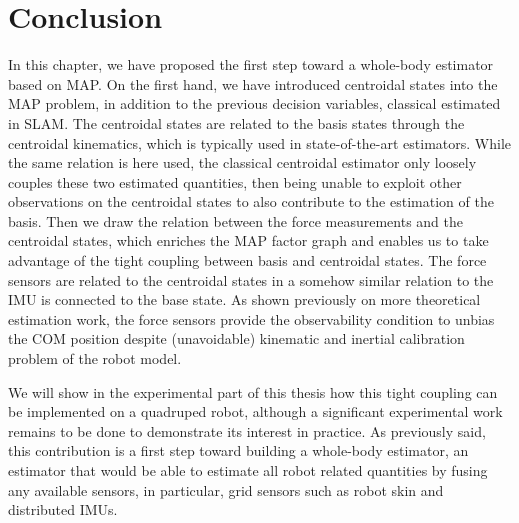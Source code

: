 \section{Conclusion}

In this chapter, we have proposed the first step toward a whole-body estimator
based on MAP. On the first hand, we have introduced centroidal states into the MAP
problem, in addition to the previous decision variables, classical estimated in SLAM.
The centroidal states are related to the basis states through the centroidal kinematics,
which is typically used in state-of-the-art estimators. While the same relation is
here used, the classical centroidal estimator only loosely couples these two estimated
quantities, then being unable to exploit other observations on the centroidal states
to also contribute to the estimation of the basis.
Then we draw the relation between the force measurements and the centroidal states,
which enriches the MAP factor graph and enables us to take advantage of the tight coupling
between basis and centroidal states. The force sensors are related to the centroidal states
in a somehow similar relation to the IMU is connected to the base state. As shown
previously on more theoretical estimation work, the force sensors provide the
observability condition to unbias the COM position despite (unavoidable) kinematic
and inertial calibration problem of the robot model.

We will show in the experimental part of this thesis how this tight coupling can
be implemented on a quadruped robot, although a significant experimental work
remains to be done to demonstrate its interest in practice. As previously said, this
contribution is a first step toward building a whole-body estimator, \ie an estimator
that would be able to estimate all robot related quantities by fusing any
available sensors, in particular, grid sensors such as robot skin and distributed IMUs.
